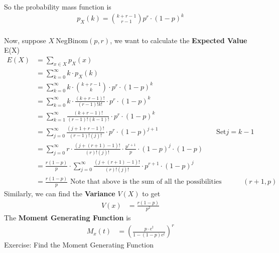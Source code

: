 \documentclass[11pt,oneside]{book}
\theoremstyle{break}
\theoremstyle{break}
\newcommand{\exercise}{\color{green}Exercise: \color{black}}
\begin{document}
So the probability mass function is \begin{align*}
p_X(k)=\binom{k+r-1}{r-1}p^r\cdot (1-p)^k
\end{align*}
\hfill\\
Now, suppose $X~$NegBinom$(p,r)$, we want to calculate the \textbf{Expected Value} E(X)\begin{align*}
E(X)&=\sum_{x\in X}p_X(x)\\
&=\sum_{k=0}^{\infty}k\cdot p_X(k)\\
&=\sum_{k=0}^{\infty}k\cdot \binom{k+r-1}{k} \cdot p^r\cdot (1-p)^k\\
&=\sum_{k=0}^{\infty}k\cdot \frac{(k+r-1)!}{(r-1)!k!} \cdot p^r\cdot (1-p)^k\\
&=\sum_{k=1}^{\infty} \frac{(k+r-1)!}{(r-1)!(k-1)!} \cdot p^r\cdot (1-p)^k\\
&=\sum_{j=0}^{\infty} \frac{(j+1+r-1)!}{(r-1)!(j)!} \cdot p^r\cdot (1-p)^{j+1}&\text{Set} j=k-1\\
&=\sum_{j=0}^{\infty} r\cdot \frac{(j+(r+1)-1)!}{(r)!(j)!} \cdot \frac{p^{r+1}}{p}\cdot (1-p)^{j}\cdot (1-p)\\
&=\frac{r(1-p)}{p}\cdot \sum_{j=0}^{\infty} \frac{(j+(r+1)-1)!}{(r)!(j)!} \cdot p^{r+1}\cdot (1-p)^{j}\\
&=\frac{r(1-p)}{p}\text{ Note that above is the sum of all the possibilities assosicated to NegBinom}(r+1,p)
\end{align*}
Similarly, we can find the \textbf{Variance} $V(X)$ to get \begin{align*}
V(x)&=\frac{r(1-p)}{p^2}
\end{align*}
The \textbf{Moment Generating Function} is \begin{align*}
M_x(t)&=\left( \frac{p\cdot e^t}{1-(1-p)e^t}\right)^r
\end{align*}
\exercise Find the Moment Generating Function
\hfill\\
\hfill\\
\end{document}
